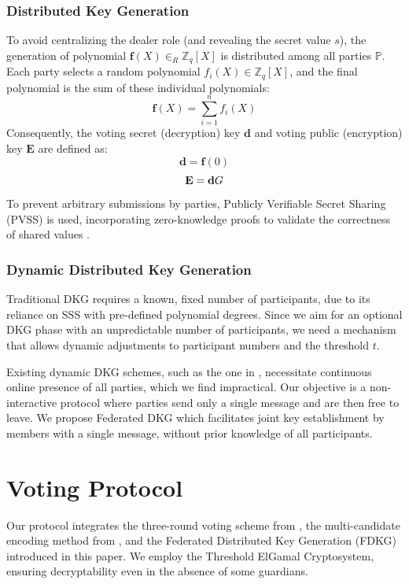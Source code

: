 \documentclass[runningheads]{llncs}
\begin{document}
\subsubsection*{Distributed Key Generation}
To avoid centralizing the dealer role (and revealing the secret value $s$), the generation of polynomial $\mathbf{f}(X) \in_R \mathbb{Z}_q[X]$ is distributed among all parties $\mathbb{P}$. Each party selects a random polynomial $f_{i}(X) \in \mathbb{Z}_q[X]$, and the final polynomial is the sum of these individual polynomials: \[\mathbf{f}(X)=\sum_{i=1}^{n}f_i(X)\] Consequently, the voting secret (decryption) key $\mathbf{d}$ and voting public (encryption) key $\mathbf{E}$ are defined as: $$\mathbf{d}=\mathbf{f}(0)$$ $$\mathbf{E}=\mathbf{d} G$$ 
To prevent arbitrary submissions by parties, Publicly Verifiable Secret Sharing (PVSS) is used, incorporating zero-knowledge proofs to validate the correctness of shared values \cite{goosSimplePubliclyVerifiable1999}.

\subsubsection*{Dynamic Distributed Key Generation}
Traditional DKG requires a known, fixed number of participants, due to its reliance on SSS with pre-defined polynomial degrees. Since we aim for an optional DKG phase with an unpredictable number of participants, we need a mechanism that allows dynamic adjustments to participant numbers and the threshold $t$.

Existing dynamic DKG schemes, such as the one in \cite{delerableeDynamicThresholdPublickey2008}, necessitate continuous online presence of all parties, which we find impractical. Our objective is a non-interactive protocol where parties send only a single message and are then free to leave. We propose Federated DKG which facilitates joint key establishment by members with a single message, without prior knowledge of all participants.

\section{Voting Protocol}

Our protocol integrates the three-round voting scheme from \cite{schoenmakersLectureNotesCryptographic2018}, the multi-candidate encoding method from \cite{haoAnonymousVotingTworound2010}, and the Federated Distributed Key Generation (FDKG) introduced in this paper. We employ the Threshold ElGamal Cryptosystem, ensuring decryptability even in the absence of some guardians.
\end{document}
